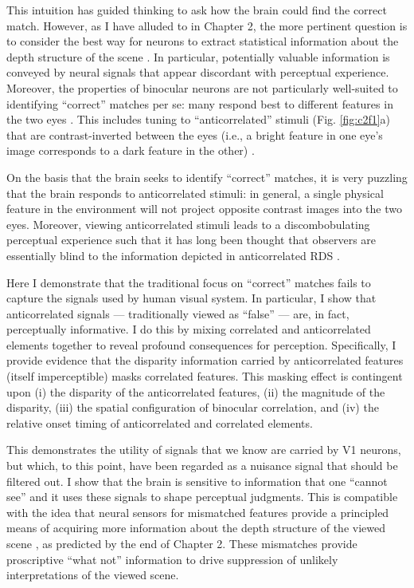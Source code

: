 This intuition has guided thinking to ask how the brain could find the correct match. However, as I have alluded to in Chapter 2, the more pertinent question is to consider the best way for neurons to extract statistical information about the depth structure of the scene \cite{Goncalves:2017aa}. In particular, potentially valuable information is conveyed by neural signals that appear discordant with perceptual experience. Moreover, the properties of binocular neurons are not particularly well-suited to identifying ``correct'' matches per se: many respond best to different features in the two eyes \cite{DeAngelis:1991mb,Prince:2002uq,Tsao:2003pi}. This includes tuning to ``anticorrelated'' stimuli (Fig. \ref{fig:c2f1}a) that are contrast-inverted between the eyes (i.e., a bright feature in one eye's image corresponds to a dark feature in the other) \cite{Ohzawa:1990cq,Cumming:1997ve}.

On the basis that the brain seeks to identify ``correct'' matches, it is very puzzling that the brain responds to anticorrelated stimuli: in general, a single physical feature in the environment will not project opposite contrast images into the two eyes. Moreover, viewing anticorrelated stimuli leads to a discombobulating perceptual experience such that it has long been thought that observers are essentially blind to the information depicted in anticorrelated RDS \cite{BLTJ:BLTJ3954,Cogan:1993yr,Cumming:1998ib,Read:2000kx,Hibbard2014}.

Here I demonstrate that the traditional focus on ``correct'' matches fails to capture the signals used by human visual system. In particular, I show that anticorrelated signals --- traditionally viewed as ``false'' --- are, in fact, perceptually informative. I do this by mixing correlated and anticorrelated elements together to reveal profound consequences for perception. Specifically, I provide evidence that the disparity information carried by anticorrelated features (itself imperceptible) masks correlated features. This masking effect is contingent upon (i) the disparity of the anticorrelated features, (ii) the magnitude of the disparity, (iii) the spatial configuration of binocular correlation, and (iv) the relative onset timing of anticorrelated and correlated elements.

This demonstrates the utility of signals that we know are carried by V1 neurons, but which, to this point, have been regarded as a nuisance signal that should be filtered out. I show that the brain is sensitive to information that one ``cannot see'' and it uses these signals to shape perceptual judgments. This is compatible with the idea that neural sensors for mismatched features provide a principled means of acquiring more information about the depth structure of the viewed scene \cite{Goncalves:2017aa}, as predicted by the end of Chapter 2. These mismatches provide proscriptive ``what not'' information to drive suppression of unlikely interpretations of the viewed scene.


